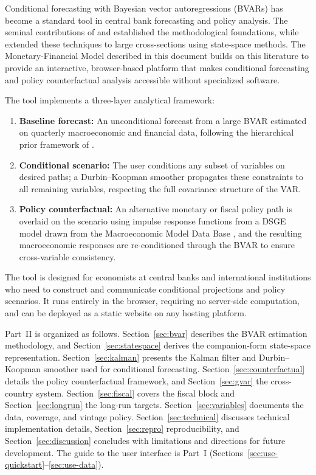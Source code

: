 \documentclass[11pt]{article}
\theoremstyle{definition}
\theoremstyle{remark}
\begin{document}
Conditional forecasting with Bayesian vector autoregressions (BVARs)
has become a standard tool in central bank forecasting and policy
analysis.  The seminal contributions of
\citet{DoanLittermanSims1984} and \citet{WaggonerZha1999}
established the methodological foundations, while
\citet{BanburaGiannoneLenza2015} extended these techniques to large
cross-sections using state-space methods.  The Monetary-Financial
Model described in this document builds on this literature to provide an
interactive, browser-based platform that makes conditional forecasting
and policy counterfactual analysis accessible without specialized
software.

The tool implements a three-layer analytical framework:
\begin{enumerate}[label=(\roman*)]
  \item \textbf{Baseline forecast:} An unconditional forecast from a
    large BVAR estimated on quarterly macroeconomic and financial data,
    following the hierarchical prior framework of \citet{Giannone2015}.
  \item \textbf{Conditional scenario:} The user conditions any subset
    of variables on desired paths; a Durbin--Koopman smoother
    \citep{DurbinKoopman2002, DurbinKoopman2012} propagates these
    constraints to all remaining variables, respecting the full
    covariance structure of the VAR.
  \item \textbf{Policy counterfactual:} An alternative monetary or
    fiscal policy path is overlaid on the scenario using impulse
    response functions from a DSGE model drawn from the Macroeconomic
    Model Data Base \citep[MMB;][]{WielandCwikMuellerSchmidtWolters2012},
    and the resulting macroeconomic responses are re-conditioned through
    the BVAR to ensure cross-variable consistency.
\end{enumerate}

The tool is designed for economists at central banks and international
institutions who need to construct and communicate conditional
projections and policy scenarios.  It runs entirely in the browser,
requiring no server-side computation, and can be deployed as a static
website on any hosting platform.

Part~II is organized as follows.  Section~\ref{sec:bvar}
describes the BVAR estimation methodology, and
Section~\ref{sec:statespace} derives the companion-form state-space
representation.  Section~\ref{sec:kalman} presents the Kalman filter
and Durbin--Koopman smoother used for conditional forecasting.
Section~\ref{sec:counterfactual} details the policy counterfactual
framework, and Section~\ref{sec:gvar} the cross-country system.
Section~\ref{sec:fiscal} covers the fiscal block and
Section~\ref{sec:longrun} the long-run targets.
Section~\ref{sec:variables} documents the data, coverage, and vintage
policy.  Section~\ref{sec:technical} discusses technical
implementation details, Section~\ref{sec:repro} reproducibility, and
Section~\ref{sec:discussion} concludes with limitations and directions
for future development.  The guide to the user interface is Part~I
(Sections~\ref{sec:use-quickstart}--\ref{sec:use-data}).
\end{document}
